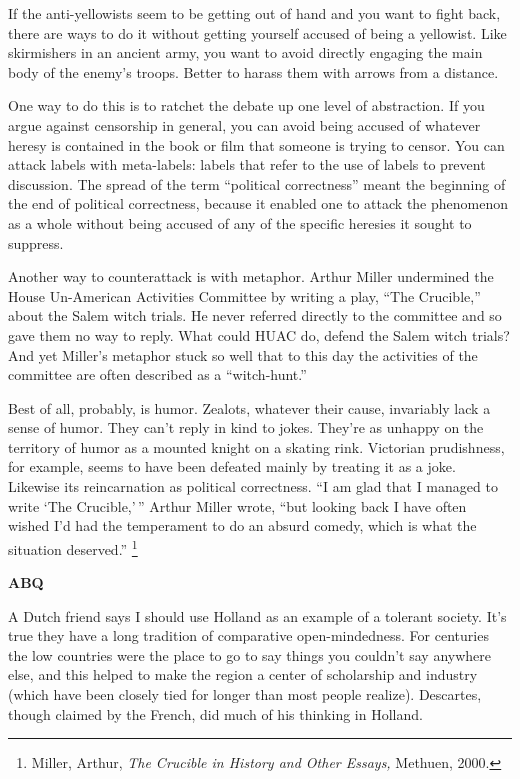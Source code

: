 If the anti-yellowists seem to be getting out of hand and you want to
fight back, there are ways to do it without getting yourself accused of
being a yellowist. Like skirmishers in an ancient army, you want to
avoid directly engaging the main body of the enemy's troops. Better to
harass them with arrows from a distance.

One way to do this is to ratchet the debate up one level of abstraction.
If you argue against censorship in general, you can avoid being accused
of whatever heresy is contained in the book or film that someone is
trying to censor. You can attack labels with meta-labels: labels that
refer to the use of labels to prevent discussion. The spread of the term
``political correctness'' meant the beginning of the end of political
correctness, because it enabled one to attack the phenomenon as a whole
without being accused of any of the specific heresies it sought to
suppress.

Another way to counterattack is with metaphor. Arthur Miller undermined
the House Un-American Activities Committee by writing a play, ``The
Crucible,'' about the Salem witch trials. He never referred directly to
the committee and so gave them no way to reply. What could HUAC do,
defend the Salem witch trials? And yet Miller's metaphor stuck so well
that to this day the activities of the committee are often described as
a ``witch-hunt.''

Best of all, probably, is humor. Zealots, whatever their cause,
invariably lack a sense of humor. They can't reply in kind to jokes.
They're as unhappy on the territory of humor as a mounted knight on a
skating rink. Victorian prudishness, for example, seems to have been
defeated mainly by treating it as a joke. Likewise its reincarnation as
political correctness. ``I am glad that I managed to write `The
Crucible,'\,'' Arthur Miller wrote, ``but looking back I have often
wished I'd had the temperament to do an absurd comedy, which is what the
situation deserved.'' \footnote{Miller, Arthur, \emph{The Crucible in History and Other
Essays,} Methuen, 2000.}

\textbf{ABQ}

A Dutch friend says I should use Holland as an example of a tolerant
society. It's true they have a long tradition of comparative
open-mindedness. For centuries the low countries were the place to go to
say things you couldn't say anywhere else, and this helped to make the
region a center of scholarship and industry (which have been closely
tied for longer than most people realize). Descartes, though claimed by
the French, did much of his thinking in Holland.

